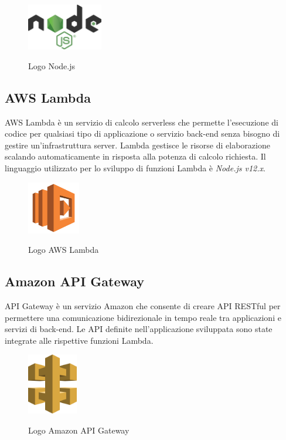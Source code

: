 	\begin{figure}[H]
		\centering
		\includegraphics[width=3.3cm]{immagini/nodejs.png} \\
		\caption{\label{fig:logo_node} Logo Node.js}
	\end{figure}
	
	\subsection{AWS Lambda}
	AWS Lambda è un servizio di calcolo serverless che permette l'esecuzione di codice per qualsiasi tipo di applicazione o servizio back-end senza bisogno di gestire un'infrastruttura server. Lambda gestisce le risorse di elaborazione scalando automaticamente in risposta alla potenza di calcolo richiesta. Il linguaggio utilizzato per lo
	sviluppo di funzioni Lambda è \emph{Node.js v12.x}.
	
	\begin{figure}[H]
		\centering
		\includegraphics[width=2.3cm]{immagini/aws-lambda.png} \\
		\caption{\label{fig:logo_lambda} Logo AWS Lambda}
	\end{figure}
	
	\subsection{Amazon API Gateway}
	API Gateway è un servizio Amazon che consente di creare API RESTful per permettere una comunicazione bidirezionale in tempo reale tra applicazioni e servizi di back-end. Le \gls{API} definite nell'applicazione sviluppata sono state
	integrate alle rispettive funzioni Lambda.
	
	\begin{figure}[H]
		\centering
		\includegraphics[width=2.2cm]{immagini/api-gateway.png} \\
		\caption{\label{fig:logo_apigateway} Logo Amazon API Gateway}
	\end{figure}
	

